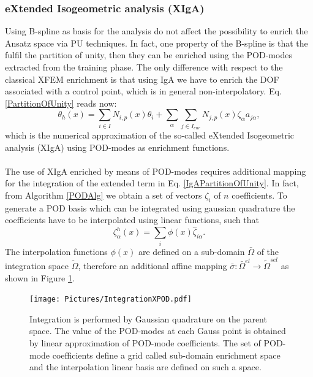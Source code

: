 \documentclass[3p]{article}
\begin{document}
\subsubsection*{eXtended Isogeometric analysis (XIgA)}
Using B-spline as basis for the analysis do not affect the possibility to enrich the Ansatz space via PU techniques. In fact, one property of the B-spline is that the fulfil the partition of unity, then they can be enriched using the POD-modes extracted from the training phase. The only difference with respect to the classical XFEM enrichment is that using IgA we have to enrich the DOF associated with a control point, which is in general non-interpolatory. Eq. \ref{PartitionOfUnity} reads now:
\begin{equation}
\theta_{h}(x) = \sum_{i\in I} N_{i,p}(x)\theta_{i} + \sum_{\alpha}\sum_{j\in I_{enr}} N_{j,p}(x)\zeta_{\alpha}a_{j\alpha},
\label{IgAPartitionOfUnity}
\end{equation}
which is the numerical approximation of the so-called eXtended Isogeometric analysis (XIgA) using POD-modes as enrichment functions.\\
\\
\indent 
The use of XIgA enriched by means of POD-modes requires additional mapping for the integration of the extended term in Eq. \ref{IgAPartitionOfUnity}. In fact, from Algorithm \ref{PODAlg} we obtain a set of vectors $\zeta_{i}$ of $n$ coefficients. To generate a POD basis which can be integrated using gaussian quadrature the coefficients have to be interpolated using linear functions, such that
\begin{equation}
\zeta_{\alpha}^{h}(x) = \sum_{i}\phi(x)\hat{\zeta}_{i\alpha}.
\end{equation} 
The interpolation functions $\phi(x)$ are defined on a sub-domain $\bar{\Omega}$ of the integration space $\tilde{\Omega}$, therefore an additional affine mapping $\bar{\sigma}:\bar{\Omega}^{el}\rightarrow\tilde{\Omega}^{sel}$ as shown in Figure \ref{fig:IntegrationMappingPODXIgA}.
\begin{figure}
\texttt{[image: Pictures/IntegrationXPOD.pdf]}
\caption{Integration is performed by Gaussian quadrature on the parent space. The value of the POD-modes at each Gauss point is obtained by linear approximation of POD-mode coefficients. The set of POD-mode coefficients define a grid called sub-domain enrichment space and the interpolation linear basis are defined on such a space.}
\label{fig:IntegrationMappingPODXIgA}
\end{figure}
\end{document}
